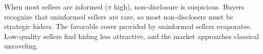 When most sellers are informed ($\pi$ high), non-disclosure is suspicious. Buyers recognize that uninformed sellers are rare, so most non-disclosers must be strategic hiders. The favorable cover provided by uninformed sellers evaporates. Low-quality sellers find hiding less attractive, and the market approaches classical unraveling.
